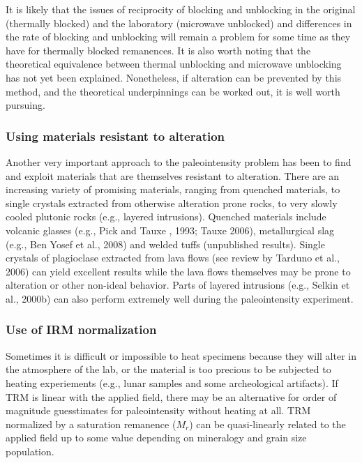  It is likely that the issues of reciprocity of blocking and unblocking in the original (thermally blocked) and the laboratory (microwave unblocked) and differences in the rate of blocking and unblocking will remain a  problem for some time as they have for thermally blocked remanences.   
It is also worth noting that the
theoretical equivalence between thermal unblocking and microwave unblocking has not yet been explained.    Nonetheless, if alteration can be prevented by this method, and the theoretical underpinnings can be worked out, it is well worth pursuing.
 
\subsubsection{Using materials resistant to alteration}
 
 Another very important approach to the paleointensity problem has been to find and exploit materials that are themselves resistant to alteration.      There are an increasing variety of promising materials, ranging from quenched materials, to single crystals extracted from otherwise alteration prone rocks,  to very slowly cooled plutonic rocks (e.g., layered intrusions).       Quenched materials include volcanic glasses (e.g.,
  Pick and Tauxe , 1993; Tauxe 2006),  metallurgical slag (e.g., 
  Ben Yosef et al., 2008) and  welded tuffs (unpublished results).    Single crystals of plagioclase extracted from lava flows (see review by 
  Tarduno et al., 2006) \nocite{tarduno06} can yield excellent results while the lava flows themselves may be  prone to alteration or other non-ideal  behavior.    Parts of layered intrusions (e.g., 
 Selkin et al., 2000b) can also perform extremely well during the paleointensity experiment.   \nocite{pick93,tauxe06b,selkin00,tarduno06}    
 

  
\subsubsection{Use of IRM normalization}

  Sometimes it is difficult or impossible to heat specimens because they will alter in the atmosphere of the lab, or the material is too precious to be subjected to heating experiements (e.g., lunar samples and  some archeological artifacts).   If TRM is linear with the applied field, there may be an alternative for order of magnitude guesstimates for paleointensity without heating at all.  TRM normalized by a saturation remanence ($M_r$) can be  quasi-linearly related to the applied field  up to some value depending on mineralogy and grain size population.    
  
